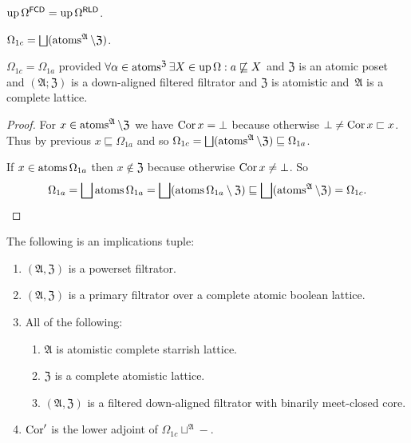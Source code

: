 \begin{cor}
  $\operatorname{up} \Omega^{\mathsf{FCD}} = \operatorname{up}
  \Omega^{\mathsf{RLD}}$.
\end{cor}

\begin{defn}
$\Omega_{1c} =
\bigsqcup(\atoms^{\mathfrak{A}}\setminus\mathfrak{Z})$.
\end{defn}

\begin{prop}
$\Omega_{1c} = \Omega_{1a}$ provided
  $\forall \alpha \in \operatorname{atoms}^{\mathfrak{Z}} \exists X \in \operatorname{up}
  \Omega : a \not\sqsubseteq X$ and $\mathfrak{Z}$ is an atomic
  poset and $(\mathfrak{A}; \mathfrak{Z})$ is a down-aligned
  filtered filtrator and $\mathfrak{Z}$ is atomistic and~$\mathfrak{A}$
  is a complete lattice.
\end{prop}

\begin{proof}
For $x\in\operatorname{atoms}^{\mathfrak{A}}\setminus\mathfrak{Z}$ we have
$\operatorname{Cor} x=\bot$ because otherwise $\bot\ne\operatorname{Cor} x\sqsubset x$.
Thus by previous $x\sqsubseteq\Omega_{1a}$ and so
$\Omega_{1c} =
\bigsqcup(\atoms^{\mathfrak{A}}\setminus\mathfrak{Z}) \sqsubseteq
\Omega_{1a}$.

If $x\in\operatorname{atoms}\Omega_{1a}$ then $x\notin\mathfrak{Z}$ because otherwise
$\operatorname{Cor} x\ne\bot$. So \[ \Omega_{1a}=\bigsqcup\atoms \Omega_{1a}=
\bigsqcup(\atoms \Omega_{1a}\setminus\mathfrak{Z})\sqsubseteq
\bigsqcup(\atoms^{\mathfrak{A}}\setminus\mathfrak{Z}) =
\Omega_{1c}. \]
\end{proof}


\begin{thm}
The following is an implications tuple:
\begin{enumerate}
\item\label{cor-adj-omega-pow}
  $(\mathfrak{A},\mathfrak{Z})$ is a powerset filtrator.
\item\label{cor-adj-omega-cond}
  $(\mathfrak{A},\mathfrak{Z})$ is a primary filtrator over
  a complete atomic boolean lattice.
\item\label{cor-adj-omega-flt} All of the following:
  \begin{enumerate}
    \item $\mathfrak{A}$ is atomistic complete starrish lattice.
    \item $\mathfrak{Z}$ is a complete atomistic lattice.
    \item $(\mathfrak{A},\mathfrak{Z})$ is a filtered
      down-aligned filtrator with binarily meet-closed core.
  \end{enumerate}
\item\label{cor-adj-omega-res} $\operatorname{Cor}'$ is the lower adjoint of
  $\Omega_{1c}\sqcup^{\mathfrak{A}}-$.
\end{enumerate}
\end{thm}

